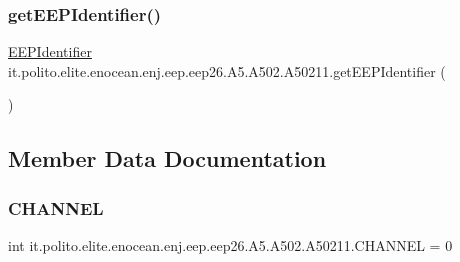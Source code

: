 \subsubsection{\texorpdfstring{get\+E\+E\+P\+Identifier()}{getEEPIdentifier()}}
{\footnotesize\ttfamily \hyperlink{classit_1_1polito_1_1elite_1_1enocean_1_1enj_1_1eep_1_1_e_e_p_identifier}{E\+E\+P\+Identifier} it.\+polito.\+elite.\+enocean.\+enj.\+eep.\+eep26.\+A5.\+A502.\+A50211.\+get\+E\+E\+P\+Identifier (\begin{DoxyParamCaption}{ }\end{DoxyParamCaption})}



\subsection{Member Data Documentation}
\hypertarget{classit_1_1polito_1_1elite_1_1enocean_1_1enj_1_1eep_1_1eep26_1_1_a5_1_1_a502_1_1_a50211_a1ca77e1de5ec7586bc2a41b77dd490bd}{}\label{classit_1_1polito_1_1elite_1_1enocean_1_1enj_1_1eep_1_1eep26_1_1_a5_1_1_a502_1_1_a50211_a1ca77e1de5ec7586bc2a41b77dd490bd} 
\subsubsection{\texorpdfstring{C\+H\+A\+N\+N\+EL}{CHANNEL}}
{\footnotesize\ttfamily int it.\+polito.\+elite.\+enocean.\+enj.\+eep.\+eep26.\+A5.\+A502.\+A50211.\+C\+H\+A\+N\+N\+EL = 0\hspace{0.3cm}{\ttfamily [static]}}

\hypertarget{classit_1_1polito_1_1elite_1_1enocean_1_1enj_1_1eep_1_1eep26_1_1_a5_1_1_a502_1_1_a50211_a732e980c4d766ace6ccc995600bdff3e}{}\label{classit_1_1polito_1_1elite_1_1enocean_1_1enj_1_1eep_1_1eep26_1_1_a5_1_1_a502_1_1_a50211_a732e980c4d766ace6ccc995600bdff3e} 
